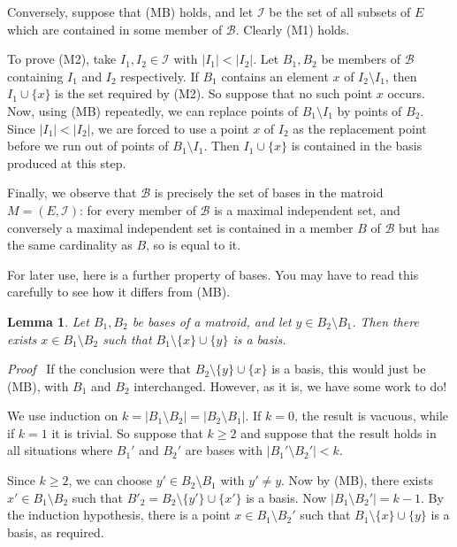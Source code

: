 \documentclass[12pt]{article}
\newtheorem{lemma}[theorem]{Lemma}
\newcommand{\head}[1]{\medbreak\noindent\textit{#1}\ }
\begin{document}
Conversely, suppose that (MB) holds, and let $\mathcal{I}$
be the set of all subsets of $E$ which are contained in some member
of $\mathcal{B}$. Clearly (M1) holds.

To prove (M2), take $I_1, I_2\in\mathcal{I}$ with $|I_1|<|I_2|$.
Let $B_1,B_2$ be members of $\mathcal{B}$ containing $I_1$ and
$I_2$ respectively. If $B_1$ contains an element $x$ of
$I_2\setminus I_1$, then $I_1\cup\{x\}$ is the set required by (M2).
So suppose that no such point $x$ occurs. Now, using (MB)
repeatedly, we can replace points of $B_1\setminus I_1$ by points
of $B_2$. Since $|I_1|<|I_2|$, we are forced to use a point $x$ of
$I_2$ as the replacement point before we run out of points of
$B_1\setminus I_1$. Then $I_1\cup\{x\}$ is contained in the basis
produced at this step.

Finally, we observe that $\mathcal{B}$ is precisely the set of
bases in the matroid $M=(E,\mathcal{I})$: for every member of
$\mathcal{B}$ is a maximal independent set, and conversely a
maximal independent set is contained in a member $B$ of $\mathcal B$
but has the same cardinality as $B$, so is equal to it.

\medbreak

For later use, here is a further property of bases. You may have to
read this carefully to see how it differs from (MB).

\begin{lemma}
Let $B_1,B_2$ be bases of a matroid, and let $y\in B_2\setminus B_1$.
Then there exists $x\in B_1\setminus B_2$ such that
$B_1\setminus\{x\}\cup\{y\}$ is a basis.
\label{l:dualb}
\end{lemma}

\head{Proof} If the conclusion were that $B_2\setminus\{y\}\cup\{x\}$
is a basis, this would just be (MB), with $B_1$ and $B_2$
interchanged. However, as it is, we have some work to do!

We use induction on
$k=|B_1\setminus B_2|=|B_2\setminus B_1|$. If $k=0$, the result
is vacuous, while if $k=1$ it is trivial. So suppose that $k\ge2$
and suppose that the result holds in all situations where $B_1'$
and $B_2'$ are bases with $|B_1'\setminus B_2'|<k$.

Since $k\ge2$, we can choose $y'\in B_2\setminus B_1$ with
$y'\not=y$. Now by (MB), there exists $x'\in B_1\setminus B_2$
such that $B'_2=B_2\setminus\{y'\}\cup\{x'\}$ is a basis. Now
$|B_1\setminus B_2'|=k-1$. By the induction hypothesis, there is
a point $x\in B_1\setminus B_2'$ such that $B_1\setminus\{x\}\cup\{y\}$
is a basis, as required.
\end{document}

